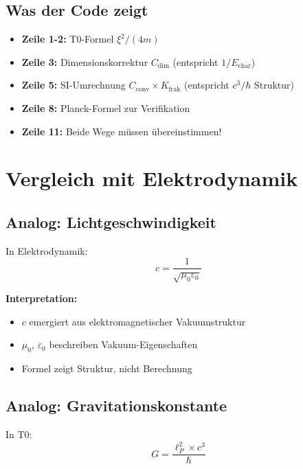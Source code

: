	\subsection{Was der Code zeigt}
	
	\begin{itemize}
		\item \textbf{Zeile 1-2:} T0-Formel $\xi^2/(4m)$
		\item \textbf{Zeile 3:} Dimensionskorrektur $C_{\text{dim}}$ (entspricht $1/E_{\text{char}}$)
		\item \textbf{Zeile 5:} SI-Umrechnung $C_{\text{conv}} \times K_{\text{frak}}$ (entspricht $c^3/\hbar$ Struktur)
		\item \textbf{Zeile 8:} Planck-Formel zur Verifikation
		\item \textbf{Zeile 11:} Beide Wege müssen übereinstimmen!
	\end{itemize}
	
	\section{Vergleich mit Elektrodynamik}
	
	\subsection{Analog: Lichtgeschwindigkeit}
	
	In Elektrodynamik:
	\begin{equation}
		c = \frac{1}{\sqrt{\mu_0 \varepsilon_0}}
	\end{equation}
	
	\textbf{Interpretation:}
	\begin{itemize}
		\item $c$ emergiert aus elektromagnetischer Vakuumstruktur
		\item $\mu_0$, $\varepsilon_0$ beschreiben Vakuum-Eigenschaften
		\item Formel zeigt Struktur, nicht Berechnung
	\end{itemize}
	
	\subsection{Analog: Gravitationskonstante}
	
	In T0:
	\begin{equation}
		G = \frac{\ell_P^2 \times c^3}{\hbar}
	\end{equation}
	
